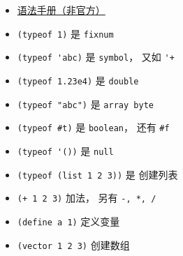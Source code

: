
\begin{itemize}
\item \href{https://code.google.com/archive/p/femtolisp/wikis/Manual.wiki}{语法手册（非官方）}
\item \verb`(typeof 1)` 是 \verb`fixnum`
\item \verb`(typeof 'abc)` 是 \verb`symbol`， 又如 \verb`'+`
\item \verb`(typeof 1.23e4)` 是 \verb`double`
\item \verb`(typeof "abc")` 是 \verb`array byte`
\item \verb`(typeof #t)` 是 \verb`boolean`， 还有 \verb`#f`
\item \verb`(typeof '())` 是 \verb`null`
\item \verb`(typeof (list 1 2 3))` 是 \verb`` 创建列表
\item \verb`(+ 1 2 3)` 加法， 另有 \verb`-, *, /`
\item \verb`(define a 1)` 定义变量

\item \verb`(vector 1 2 3)` 创建数组


\end{itemize}

